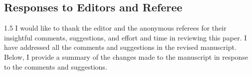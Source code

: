 \documentclass[12pt,english]{article}
\newcommand{\rrxspc}{1.5}
\begin{document}
\begin{refsection}
\setcounter{section}{0}
\renewcommand{\thesection}{\Alph{section}}
\renewcommand{\thesubsection}{\Alph{section}.\arabic{subsection}}
\renewcommand{\thesubsubsection}{\Alph{section}.\arabic{subsection}.\arabic{subsubsection}}

        \section{Responses to Editors and Referee} \label{r&r:responses}
        \begin{spacing}{\rrxspc}
            I would like to thank the editor and the anonymous referees for their insightful comments, suggestions, and effort and time in reviewing this paper. I have addressed all the comments and suggestions in the revised manuscript. Below, I provide a summary of the changes made to the manuscript in response to the comments and suggestions.
        \end{spacing}

    \newpage
    

\end{refsection}
\end{document}

